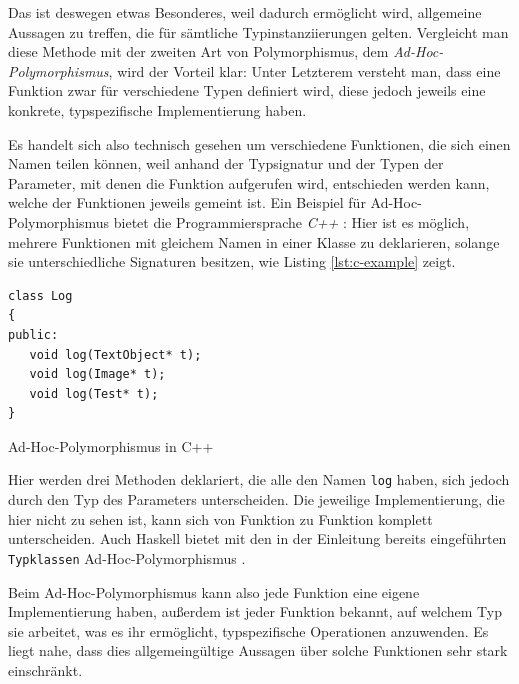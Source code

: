 Das ist deswegen etwas Besonderes, weil dadurch ermöglicht wird, allgemeine Aussagen zu treffen, die für sämtliche
Typinstanziierungen gelten. Vergleicht man diese Methode mit der zweiten Art von Polymorphismus, dem \textit{Ad-Hoc-Polymorphismus},
wird der Vorteil klar: Unter Letzterem versteht man, dass eine Funktion zwar für verschiedene Typen definiert wird, diese jedoch
jeweils eine konkrete, typspezifische Implementierung haben.

Es handelt sich also technisch gesehen um verschiedene Funktionen, die sich einen Namen teilen können, weil anhand der Typsignatur
und der Typen der Parameter, mit denen die Funktion aufgerufen wird, entschieden werden kann, welche der Funktionen jeweils gemeint ist.
Ein Beispiel für Ad-Hoc-Polymorphismus bietet die Programmiersprache \textit{C++} \cite{cpp}: Hier ist es möglich, mehrere Funktionen mit gleichem
Namen in einer Klasse zu deklarieren, solange sie unterschiedliche Signaturen besitzen, wie Listing \ref{lst:c-example} zeigt.

\begin{listing}[ht]
\begin{verbatim}
class Log
{
public:
   void log(TextObject* t);
   void log(Image* t);
   void log(Test* t);
}
\end{verbatim}
\caption{Ad-Hoc-Polymorphismus in C++}
\label{lst:c-example}
\end{listing}

Hier werden drei Methoden deklariert, die alle den Namen \texttt{log} haben, sich jedoch durch den Typ des Parameters
unterscheiden. Die jeweilige Implementierung, die hier nicht zu sehen ist, kann sich von Funktion zu Funktion komplett unterscheiden.
Auch Haskell bietet mit den in der Einleitung bereits eingeführten \texttt{Typklassen} Ad-Hoc-Polymorphismus \cite{adhoc}.

Beim Ad-Hoc-Polymorphismus kann also jede Funktion eine eigene Implementierung haben, außerdem ist jeder Funktion
bekannt, auf welchem Typ sie arbeitet, was es ihr ermöglicht, typspezifische Operationen anzuwenden. Es liegt nahe, dass dies
allgemeingültige Aussagen über solche Funktionen sehr stark einschränkt.


